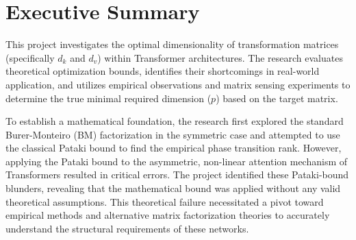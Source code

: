 

\section*{Executive Summary}

This project investigates the optimal dimensionality of transformation matrices (specifically $d_k$ and $d_v$) within Transformer architectures. The research evaluates theoretical optimization bounds, identifies their shortcomings in real-world application, and utilizes empirical observations and matrix sensing experiments to determine the true minimal required dimension ($p$) based on the target matrix.

To establish a mathematical foundation, the research first explored the standard Burer-Monteiro (BM) factorization in the symmetric case and attempted to use the classical Pataki bound to find the empirical phase transition rank. However, applying the Pataki bound to the asymmetric, non-linear attention mechanism of Transformers resulted in critical errors. The project identified these Pataki-bound blunders, revealing that the mathematical bound was applied without any valid theoretical assumptions. This theoretical failure necessitated a pivot toward empirical methods and alternative matrix factorization theories to accurately understand the structural requirements of these networks.

